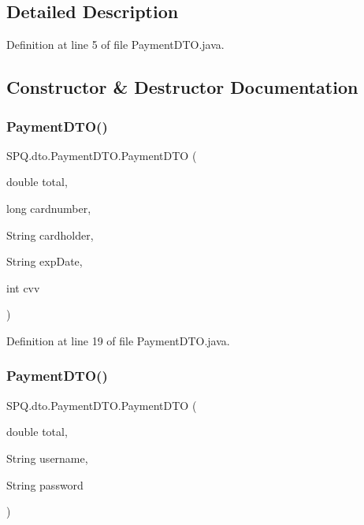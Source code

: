 \subsection{Detailed Description}


Definition at line 5 of file Payment\+D\+T\+O.\+java.



\subsection{Constructor \& Destructor Documentation}
\mbox{\label{class_s_p_q_1_1dto_1_1_payment_d_t_o_a4a6f91d0976ce0af97a8f7f15658294c}} 
\subsubsection{\texorpdfstring{Payment\+D\+T\+O()}{PaymentDTO()}\hspace{0.1cm}{\footnotesize\ttfamily [1/6]}}
{\footnotesize\ttfamily S\+P\+Q.\+dto.\+Payment\+D\+T\+O.\+Payment\+D\+TO (\begin{DoxyParamCaption}\item[{double}]{total,  }\item[{long}]{cardnumber,  }\item[{String}]{cardholder,  }\item[{String}]{exp\+Date,  }\item[{int}]{cvv }\end{DoxyParamCaption})}



Definition at line 19 of file Payment\+D\+T\+O.\+java.

\mbox{\label{class_s_p_q_1_1dto_1_1_payment_d_t_o_ab51beb9eef60e0b57b11bab85ce42454}} 
\subsubsection{\texorpdfstring{Payment\+D\+T\+O()}{PaymentDTO()}\hspace{0.1cm}{\footnotesize\ttfamily [2/6]}}
{\footnotesize\ttfamily S\+P\+Q.\+dto.\+Payment\+D\+T\+O.\+Payment\+D\+TO (\begin{DoxyParamCaption}\item[{double}]{total,  }\item[{String}]{username,  }\item[{String}]{password }\end{DoxyParamCaption})}



